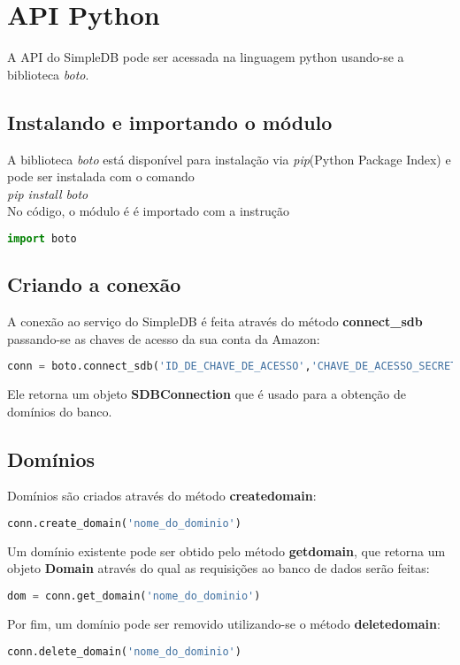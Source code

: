 \section{API Python}
A API do SimpleDB pode ser acessada na linguagem python usando-se a biblioteca \textit{boto}.
\subsection{Instalando e importando o módulo}
A biblioteca \textit{boto} está disponível para instalação via \textit{pip}(Python Package Index) e pode ser instalada com o comando
\\
\textit{pip install boto}
\\
No código, o módulo é é importado com a instrução
\begin{lstlisting}[language=Python]
import boto
\end{lstlisting}

\subsection{Criando a conexão}
A conexão ao serviço do SimpleDB é feita através do método \textbf{connect{\_}sdb} passando-se as chaves de acesso da sua conta da Amazon:
\begin{lstlisting}[language=Python]
conn = boto.connect_sdb('ID_DE_CHAVE_DE_ACESSO','CHAVE_DE_ACESSO_SECRETA')
\end{lstlisting}

Ele retorna um objeto \textbf{SDBConnection} que é usado para a obtenção de domínios do banco.

\subsection{Domínios}
Domínios são criados através do método \textbf{create{\textunderscore}domain}:
\begin{lstlisting}[language=Python]
conn.create_domain('nome_do_dominio')
\end{lstlisting}

Um domínio existente pode ser obtido pelo método \textbf{get{\textunderscore}domain}, que retorna um objeto \textbf{Domain} através do qual as requisições ao banco de dados serão feitas:
\begin{lstlisting}[language=Python]
dom = conn.get_domain('nome_do_dominio')
\end{lstlisting}

Por fim, um domínio pode ser removido utilizando-se o método \textbf{delete{\textunderscore}domain}:
\begin{lstlisting}[language=Python]
conn.delete_domain('nome_do_dominio')
\end{lstlisting}

